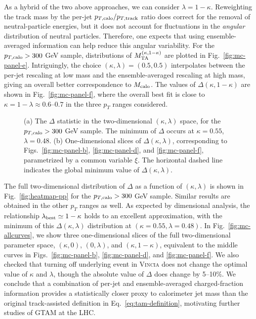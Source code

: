 \documentclass[letterpaper,11pt]{article}
\newcommand{\Fig}[1]{Fig.~\ref{#1}}
\newcommand{\Figss}[3]{Figs.~\ref{#1}, \ref{#2}, and \ref{#3}}
\newcommand{\Eq}[1]{Eq.~\eqref{#1}}
\begin{document}
As a hybrid of the two above approaches, we can consider $\lambda = 1-\kappa$.
%
Reweighting the track mass by the per-jet $p_{T,\rm calo}/p_{T,\rm track}$ ratio does correct for the removal of neutral-particle energies, but it does not account for fluctuations in the \emph{angular} distribution of neutral particles.
%
Therefore, one expects that using ensemble-averaged information can help reduce this angular variability.
%
For the $p_{T,\rm calo} > 300$ GeV sample, distributions of $M_{\rm TA}^{(\kappa,1-\kappa)}$ are plotted in \Fig{fig:mc-panel-e}.
%
Intriguingly, the choice $(\kappa, \lambda) = (0.5,0.5)$ interpolates between the per-jet rescaling at low mass and the ensemble-averaged rescaling at high mass, giving an overall better correspondence to $M_{\rm calo}$.
%
The values of $\Delta(\kappa,1-\kappa)$ are shown in \Fig{fig:mc-panel-f}, where the overall best fit is close to $\kappa = 1- \lambda \approx 0.6$--$0.7$ in the three $p_T$ ranges considered. 




\begin{figure}[t]
	\centering
	\caption{(a) The $\Delta$ statistic in the two-dimensional $(\kappa,\lambda)$ space, for the $p_{T,\rm calo} > 300$ GeV sample. The minimum of $\Delta$ occurs at $\kappa = 0.55$, $\lambda = 0.48$.  (b) One-dimensional slices of $\Delta(\kappa,\lambda)$, corresponding to \Figss{fig:mc-panel-b}{fig:mc-panel-d}{fig:mc-panel-f}, parametrized by a common variable $\xi$.  The horizontal dashed line indicates the global minimum value of $\Delta(\kappa,\lambda)$.}
	\label{fig:heatmap}
\end{figure}	


The full two-dimensional distribution of $\Delta$ as a function of $(\kappa,\lambda)$ is shown in \Fig{fig:heatmap-pp} for the $p_{T,\rm calo} > 300$ GeV sample. 
%
Similar results are obtained in the other $p_T$ ranges as well.
%
As expected by dimensional analysis, the relationship $\lambda_{\rm best} \simeq 1-\kappa$ holds to an excellent approximation, with the minimum of this $\Delta(\kappa,\lambda)$ distribution at $(\kappa=0.55, \lambda=0.48)$. 
%
In \Fig{fig:mc-allcurves}, we show three one-dimensional slices of the full two-dimensional parameter space, $(\kappa,0)$, $(0,\lambda)$, and $(\kappa, 1-\kappa)$, equivalent to the middle curves in \Figss{fig:mc-panel-b}{fig:mc-panel-d}{fig:mc-panel-f}. 
%
We also checked that turning off underlying event in \textsc{Vincia} does not change the optimal value of $\kappa$ and $\lambda$, though the absolute value of $\Delta$ does change by 5--10\%.
%
We conclude that a combination of per-jet and ensemble-averaged charged-fraction information provides a statistically closer proxy to calorimeter jet mass than the original track-assisted definition in \Eq{eq:tam-definition}, motivating further studies of GTAM at the LHC.
\end{document}
